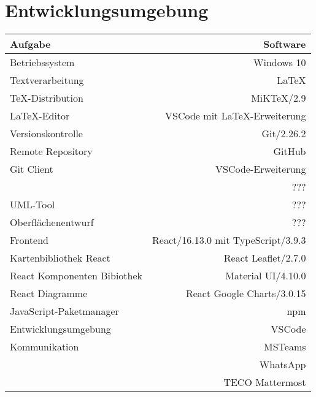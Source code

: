 \section{Entwicklungsumgebung}

\begin{tabular}[htb]{l|r}
    Aufgabe & Software\\
    \hline \hline
    Betriebssystem & Windows 10\\
    \hline
    Textverarbeitung & \LaTeX\\
    TeX-Distribution & MiKTeX/2.9\\
    \LaTeX -Editor & VSCode mit \LaTeX -Erweiterung\\
    \hline
    Versionskontrolle & Git/2.26.2\\
    Remote Repository & GitHub\\
    Git Client & VSCode-Erweiterung\\
    & ???\\
    UML-Tool & ???\\
    Oberflächenentwurf & ???\\
    \hline
    Frontend & React/16.13.0 mit TypeScript/3.9.3\\
    Kartenbibliothek React & React Leaflet/2.7.0\\
    React Komponenten Bibiothek & Material UI/4.10.0\\
    React Diagramme & React Google Charts/3.0.15\\
    JavaScript-Paketmanager & npm\\
    Entwicklungsumgebung & VSCode\\
    \hline
    Kommunikation & MSTeams\\
    & WhatsApp\\
    & TECO Mattermost\\
\end{tabular}    
